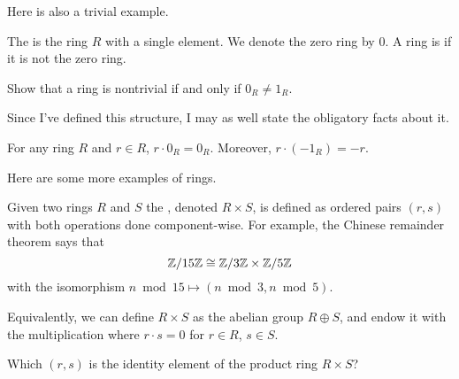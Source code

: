 Here is also a trivial example.
\begin{definition}
	The  is the ring $R$ with a single element.
	We denote the zero ring by $0$.
	A ring is  if it is not the zero ring.
\end{definition}
\begin{exercise}
	[Comedic]
	Show that a ring is nontrivial if and only if $0_R \ne 1_R$.
\end{exercise}

Since I've defined this structure, I may as well state the obligatory facts about it.
\begin{fact}
	For any ring $R$ and $r \in R$, $r \cdot 0_R = 0_R$.
	Moreover, $r \cdot (-1_R) = -r$.
\end{fact}

Here are some more examples of rings.
\begin{example}
	\label{ex:product_ring}
	Given two rings $R$ and $S$ the ,
	denoted $R \times S$, is defined as ordered pairs $(r,s)$
	with both operations done component-wise.
	For example, the Chinese remainder theorem says
	that \[ \mathbb Z/15\mathbb Z \cong \mathbb Z/3\mathbb Z \times \mathbb Z/5\mathbb Z \]
	with the isomorphism $n \bmod{15} \mapsto (n \bmod 3, n \bmod 5)$.
\end{example}
\begin{remark}
	Equivalently, we can define $R \times S$ as the abelian group $R \oplus S$,
	and endow it with the multiplication where $r \cdot s = 0$
	for $r \in R$, $s \in S$.
\end{remark}
\begin{ques}
	Which $(r,s)$ is the identity element of the product ring $R \times S$?
\end{ques}

